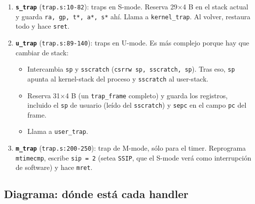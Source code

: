 \documentclass[11pt,a4paper]{article}
\begin{document}
\begin{enumerate}[leftmargin=*]
    \item \textbf{\texttt{s\_trap}} (\texttt{trap.s:10-82}): traps
        en S-mode. Reserva 29$\times$4 B en el stack actual y
        guarda \texttt{ra, gp, t*, a*, s*} ahí. Llama a
        \texttt{kernel\_trap}. Al volver, restaura todo y hace
        \texttt{sret}.
    \item \textbf{\texttt{u\_trap}} (\texttt{trap.s:89-140}): traps
        en U-mode. Es más complejo porque hay que cambiar de stack:
        \begin{itemize}[nosep]
            \item Intercambia \texttt{sp} y \texttt{sscratch}
                (\texttt{csrrw sp, sscratch, sp}). Tras eso,
                \texttt{sp} apunta al kernel-stack del proceso y
                \texttt{sscratch} al user-stack.
            \item Reserva 31$\times$4 B (un \texttt{trap\_frame}
                completo) y guarda los registros, incluido el
                \texttt{sp} de usuario (leído del \texttt{sscratch})
                y \texttt{sepc} en el campo \texttt{pc} del frame.
            \item Llama a \texttt{user\_trap}.
        \end{itemize}
    \item \textbf{\texttt{m\_trap}} (\texttt{trap.s:200-250}): trap
        de M-mode, sólo para el timer. Reprograma
        \texttt{mtimecmp}, escribe \texttt{sip = 2} (setea
        \texttt{SSIP}, que el S-mode verá como interrupción de
        software) y hace \texttt{mret}.
\end{enumerate}

\subsection*{Diagrama: dónde está cada handler}
\end{document}
